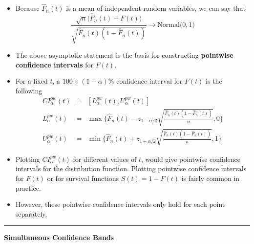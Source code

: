 \documentclass[]{book}
\begin{document}
\begin{itemize}
\item
  Because \(\hat{F}_{n}(t)\) is a mean of independent random variables, we can say that
  \begin{equation}
  \frac{ \sqrt{n}\Big( \hat{F}_{n}(t) - F(t) \Big) }{\sqrt{ \hat{F}_{n}(t)(1 - \hat{F}_{n}(t))}} \longrightarrow \textrm{Normal}\Big(0, 1 \Big)
  \nonumber
  \end{equation}
\item
  The above asymptotic statement is the basis for constructing \textbf{pointwise confidence intervals} for \(F(t)\).
\item
  For a fixed \(t\), a \(100 \times (1-\alpha)\%\) confidence interval for \(F(t)\) is the following
  \begin{eqnarray}
  CI_{\alpha}^{pw}(t) &=& [L_{\alpha}^{pw}(t), U_{\alpha}^{pw}(t)] \nonumber \\
  L_{\alpha}^{pw}(t) &=& \max\Bigg\{\hat{F}_{n}(t) - z_{1 - \alpha/2} \sqrt{ \frac{\hat{F}_{n}(t)(1 - \hat{F}_{n}(t)) }{n} }, 0 \Bigg\} \nonumber \\
  U_{\alpha}^{pw}(t) &=& \min\Bigg\{ \hat{F}_{n}(t) + z_{1 - \alpha/2} \sqrt{ \frac{\hat{F}_{n}(t)(1 - \hat{F}_{n}(t)) }{n} }, 1 \Bigg\}
  \label{eq:pointwise-cis}
  \end{eqnarray}
\item
  Plotting \(CI_{\alpha}^{pw}(t)\) for different values of \(t\), would give pointwise confidence intervals
  for the distribution function. Plotting pointwise confidence
  intervals for \(F(t)\) or for survival functions \(S(t) = 1 - F(t)\) is fairly common in practice.
\item
  However, these pointwise confidence intervals only hold for each point separately.
\end{itemize}

\begin{center}\rule{0.5\linewidth}{\linethickness}\end{center}

\textbf{Simultaneous Confidence Bands}
\end{document}
